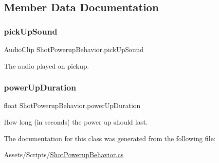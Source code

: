 \subsection{Member Data Documentation}
\mbox{\label{class_shot_powerup_behavior_a0b865b0b14261d875a66d839358408b3}} 
\subsubsection{\texorpdfstring{pickUpSound}{pickUpSound}}
{\footnotesize\ttfamily Audio\+Clip Shot\+Powerup\+Behavior.\+pick\+Up\+Sound}



The audio played on pickup. 

\mbox{\label{class_shot_powerup_behavior_aae016007c1f9cf0f78fec0278c853666}} 
\subsubsection{\texorpdfstring{powerUpDuration}{powerUpDuration}}
{\footnotesize\ttfamily float Shot\+Powerup\+Behavior.\+power\+Up\+Duration}



How long (in seconds) the power up should last. 



The documentation for this class was generated from the following file\+:\begin{DoxyCompactItemize}
\item 
Assets/\+Scripts/\mbox{\hyperlink{_shot_powerup_behavior_8cs}{Shot\+Powerup\+Behavior.\+cs}}\end{DoxyCompactItemize}
